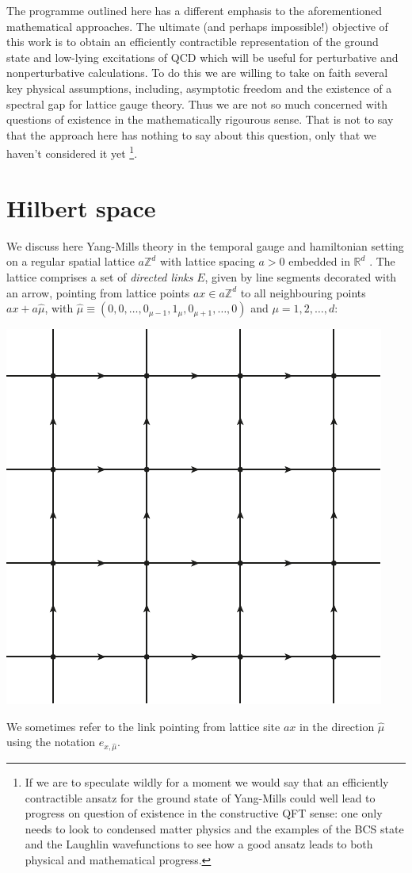 \documentclass[twocolumn,lengthcheck,superscriptaddress]{revtex4-1}
\theoremstyle{definition}
\theoremstyle{remark}
\begin{document}
The programme outlined here has a different emphasis to the aforementioned mathematical approaches. The ultimate (and perhaps impossible!) objective of this work is to obtain an efficiently contractible representation of the ground state  and low-lying excitations of QCD which will be useful for perturbative and nonperturbative calculations. To do this we are willing to take on faith several key physical assumptions, including, asymptotic freedom and the existence of a spectral gap for lattice gauge theory. Thus we are not so much concerned with questions of existence in the mathematically rigourous sense. That is not to say that the approach here has nothing to say about this question, only that we haven't considered it yet \footnote{If we are to speculate wildly for a moment we would say that an efficiently contractible ansatz for the ground state of Yang-Mills could well lead to progress on question of existence in the constructive QFT sense: one only needs to look to condensed matter physics and the examples of the BCS state and the Laughlin wavefunctions to see how a good ansatz leads to both physical and mathematical progress.}. 

\section{Hilbert space}
We discuss here Yang-Mills theory in the temporal gauge and hamiltonian setting on a regular spatial lattice $a\mathbb{Z}^d$ with lattice spacing $a > 0$ embedded in $\mathbb{R}^d$ \cite{kogut:1975a}. The lattice comprises a set of \emph{directed links} $E$, given by line segments decorated with an arrow, pointing from lattice points $ax\in a\mathbb{Z}^d$ to all neighbouring points $ax+a\widehat{\mu}$, with $\widehat{\mu} \equiv (0, 0, \ldots, 0_{\mu-1}, 1_\mu, 0_{\mu+1}, \ldots, 0)$ and $\mu = 1, 2, \ldots, d$:
\begin{center}
	\includegraphics{basiclattice.pdf}
\end{center}
We sometimes refer to the link pointing from lattice site $ax$ in the direction $\widehat{\mu}$ using the notation $e_{x,\widehat{\mu}}$.
\end{document}
